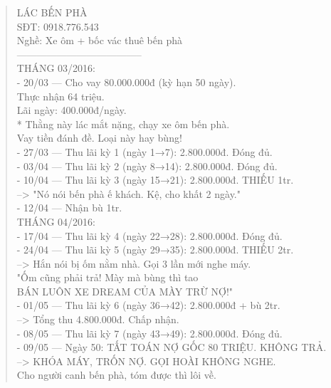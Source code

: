 \documentclass[12pt,a4paper]{article}
\begin{document}
\begin{quote}
\fontsize{9pt}{11pt}\selectfont\ttfamily
LÁC BẾN PHÀ\\
SĐT: 0918.776.543\\
Nghề: Xe ôm + bốc vác thuê bến phà\\
--------------------------------------\\
\vspace{0.2cm}
THÁNG 03/2016:\\
- 20/03 --- Cho vay 80.000.000đ (kỳ hạn 50 ngày).\\
          Thực nhận 64 triệu.\\
          Lãi ngày: 400.000đ/ngày.\\
          * Thằng này lác mắt nặng, chạy xe ôm bến phà.\\
            Vay tiền đánh đề. Loại này hay bùng!\\
\vspace{0.2cm}
- 27/03 --- Thu lãi kỳ 1 (ngày 1→7): 2.800.000đ. Đóng đủ.\\
- 03/04 --- Thu lãi kỳ 2 (ngày 8→14): 2.800.000đ. Đóng đủ.\\
- 10/04 --- Thu lãi kỳ 3 (ngày 15→21): 2.800.000đ. THIẾU 1tr.\\
          --> "Nó nói bến phà ế khách. Kệ, cho khất 2 ngày."\\
- 12/04 --- Nhận bù 1tr.\\
\vspace{0.2cm}
THÁNG 04/2016:\\
- 17/04 --- Thu lãi kỳ 4 (ngày 22→28): 2.800.000đ. Đóng đủ.\\
- 24/04 --- Thu lãi kỳ 5 (ngày 29→35): 2.800.000đ. THIẾU 2tr.\\
          --> Hắn nói bị ốm nằm nhà. Gọi 3 lần mới nghe máy.\\
              "Ốm cũng phải trả! Mày mà bùng thì tao\\
               BÁN LUÔN XE DREAM CỦA MÀY TRỪ NỢ!"\\
- 01/05 --- Thu lãi kỳ 6 (ngày 36→42): 2.800.000đ + bù 2tr.\\
          --> Tổng thu 4.800.000đ. Chấp nhận.\\
- 08/05 --- Thu lãi kỳ 7 (ngày 43→49): 2.800.000đ. Đóng đủ.\\
- 09/05 --- Ngày 50: TẤT TOÁN NỢ GỐC 80 TRIỆU. KHÔNG TRẢ.\\
          --> KHÓA MÁY, TRỐN NỢ. GỌI HOÀI KHÔNG NGHE.\\
              Cho người canh bến phà, tóm được thì lôi về.\\

\end{quote}
\end{document}

